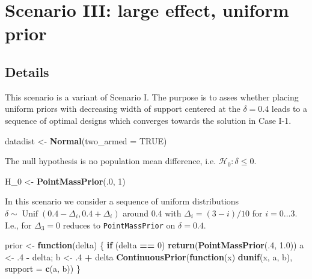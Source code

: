 \documentclass[]{book}
\newenvironment{Shaded}{\begin{snugshade}}{\end{snugshade}}
\newcommand{\ControlFlowTok}[1]{\textcolor[rgb]{0.13,0.29,0.53}{\textbf{#1}}}
\newcommand{\DataTypeTok}[1]{\textcolor[rgb]{0.13,0.29,0.53}{#1}}
\newcommand{\DecValTok}[1]{\textcolor[rgb]{0.00,0.00,0.81}{#1}}
\newcommand{\FloatTok}[1]{\textcolor[rgb]{0.00,0.00,0.81}{#1}}
\newcommand{\KeywordTok}[1]{\textcolor[rgb]{0.13,0.29,0.53}{\textbf{#1}}}
\newcommand{\NormalTok}[1]{#1}
\newcommand{\OperatorTok}[1]{\textcolor[rgb]{0.81,0.36,0.00}{\textbf{#1}}}
\newcommand{\OtherTok}[1]{\textcolor[rgb]{0.56,0.35,0.01}{#1}}
\newcommand{\StringTok}[1]{\textcolor[rgb]{0.31,0.60,0.02}{#1}}
\begin{document}
\hypertarget{scenarioIII}{%
\chapter{Scenario III: large effect, uniform prior}\label{scenarioIII}}

\hypertarget{details-2}{%
\section{Details}\label{details-2}}

This scenario is a variant of Scenario I.
The purpose is to asses whether placing uniform priors with decreasing
width of support centered at the \(\delta=0.4\) leads to a sequence of
optimal designs which converges towards the solution in Case I-1.

\begin{Shaded}
\begin{Highlighting}[]
\NormalTok{datadist <-}\StringTok{ }\KeywordTok{Normal}\NormalTok{(}\DataTypeTok{two_armed =} \OtherTok{TRUE}\NormalTok{)}
\end{Highlighting}
\end{Shaded}

The null hypothesis is no population mean difference, i.e.
\(\mathcal{H}_0:\delta \leq 0\).

\begin{Shaded}
\begin{Highlighting}[]
\NormalTok{H_}\DecValTok{0}\NormalTok{ <-}\StringTok{ }\KeywordTok{PointMassPrior}\NormalTok{(.}\DecValTok{0}\NormalTok{, }\DecValTok{1}\NormalTok{)}
\end{Highlighting}
\end{Shaded}

In this scenario we consider a sequence of uniform distributions
\(\delta\sim\operatorname{Unif}(0.4 - \Delta_i, 0.4 + \Delta_i)\)
around \(0.4\) with \(\Delta_i=(3 - i)/10\) for \(i=0\ldots 3\).
I.e., for \(\Delta_3=0\) reduces to \texttt{PointMassPrior} on \(\delta=0.4\).

\begin{Shaded}
\begin{Highlighting}[]
\NormalTok{prior <-}\StringTok{ }\ControlFlowTok{function}\NormalTok{(delta) \{}
    \ControlFlowTok{if}\NormalTok{ (delta }\OperatorTok{==}\StringTok{ }\DecValTok{0}\NormalTok{)}
        \KeywordTok{return}\NormalTok{(}\KeywordTok{PointMassPrior}\NormalTok{(.}\DecValTok{4}\NormalTok{, }\FloatTok{1.0}\NormalTok{))}
\NormalTok{    a <-}\StringTok{ }\FloatTok{.4} \OperatorTok{-}\StringTok{ }\NormalTok{delta; b <-}\StringTok{ }\FloatTok{.4} \OperatorTok{+}\StringTok{ }\NormalTok{delta}
    \KeywordTok{ContinuousPrior}\NormalTok{(}\ControlFlowTok{function}\NormalTok{(x) }\KeywordTok{dunif}\NormalTok{(x, a, b), }\DataTypeTok{support =} \KeywordTok{c}\NormalTok{(a, b))}
\NormalTok{\}}
\end{Highlighting}
\end{Shaded}
\end{document}
